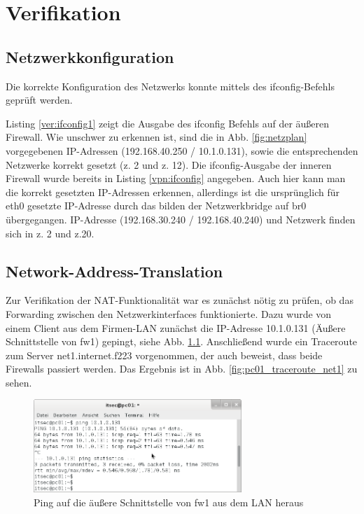 \chapter{Verifikation}
\section{Netzwerkkonfiguration}
Die korrekte Konfiguration des Netzwerks konnte mittels des ifconfig-Befehls geprüft werden. 



Listing \ref{ver:ifconfig1} zeigt die Ausgabe des ifconfig Befehls auf der äußeren Firewall. Wie unschwer zu erkennen ist, sind die in Abb. \ref{fig:netzplan} vorgegebenen IP-Adressen (192.168.40.250 / 10.1.0.131), sowie die entsprechenden Netzwerke korrekt gesetzt (z. 2 und z. 12). Die ifconfig-Ausgabe der inneren Firewall wurde bereits in Listing \ref{vpn:ifconfig} angegeben. Auch hier kann man die korrekt gesetzten IP-Adressen erkennen, allerdings ist die ursprünglich für eth0 gesetzte IP-Adresse durch das bilden der Netzwerkbridge auf br0 übergegangen. IP-Adresse (192.168.30.240 / 192.168.40.240) und Netzwerk finden sich in z. 2 und z.20.


\section{Network-Address-Translation}
Zur Verifikation der NAT-Funktionalität war es zunächst nötig zu prüfen, ob das Forwarding zwischen den Netzwerkinterfaces funktionierte. Dazu wurde von einem Client aus dem Firmen-LAN zunächst die IP-Adresse 10.1.0.131 (Äußere Schnittstelle von fw1) gepingt, siehe Abb. \ref{fig:pc01_ping_fw1}. Anschließend wurde ein Traceroute zum Server net1.internet.f223 vorgenommen, der auch beweist, dass beide Firewalls passiert werden. Das Ergebnis ist in Abb. \ref{fig:pc01_traceroute_net1} zu sehen.

\begin{figure}[h!]
	\centering
		\includegraphics[width=0.7\textwidth]{figures/pc01_ping_fw1.png}
	\caption{Ping auf die äußere Schnittstelle von fw1 aus dem LAN heraus}
	\label{fig:pc01_ping_fw1}
\end{figure}


